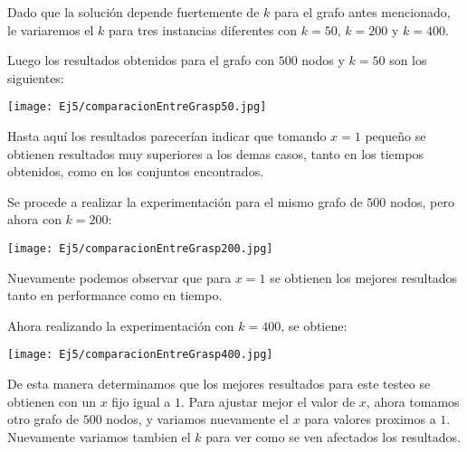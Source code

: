 Dado que la solución depende fuertemente de $k$ para el grafo antes mencionado, le variaremos el $k$ para tres instancias diferentes con $k = 50$, $k = 200$ y $k = 400$.

Luego los resultados obtenidos para el grafo con $500$ nodos y $k = 50$ son los siguientes:

\texttt{[image: Ej5/comparacionEntreGrasp50.jpg]}

Hasta aquí los resultados parecerían indicar que tomando $x = 1$ pequeño se obtienen resultados muy superiores a los demas casos, tanto en los tiempos obtenidos, como en los conjuntos encontrados.

Se procede a realizar la experimentación para el mismo grafo de $500$ nodos, pero ahora con $k = 200$:

\texttt{[image: Ej5/comparacionEntreGrasp200.jpg]}

Nuevamente podemos observar que para $x = 1$ se obtienen los mejores resultados tanto en performance como en tiempo.

Ahora realizando la experimentación con $k = 400$, se obtiene:

\texttt{[image: Ej5/comparacionEntreGrasp400.jpg]}

De esta manera determinamos que los mejores resultados para este testeo se obtienen con un $x$ fijo igual a $1$. Para ajustar mejor el valor de $x$, ahora tomamos otro grafo de $500$ nodos, y variamos nuevamente el $x$ para valores proximos a $1$. Nuevamente variamos tambien el $k$ para ver como se ven afectados los resultados.



